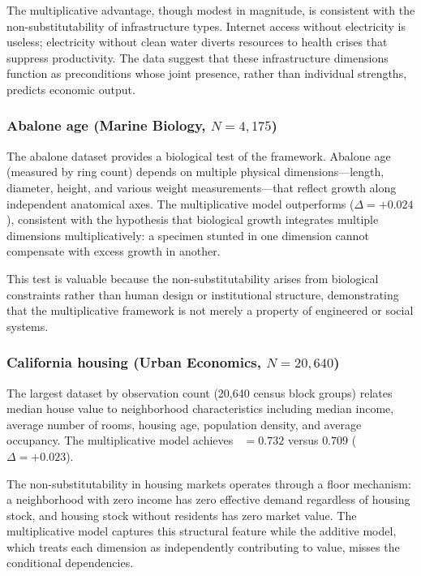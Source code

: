 \documentclass[12pt, a4paper]{article}
\theoremstyle{definition}
\theoremstyle{remark}
\DeclareMathOperator{\Spearman}{\rho_s}
\begin{document}
The multiplicative advantage, though modest in magnitude, is consistent with the non-substitutability of infrastructure types. Internet access without electricity is useless; electricity without clean water diverts resources to health crises that suppress productivity. The data suggest that these infrastructure dimensions function as preconditions whose joint presence, rather than individual strengths, predicts economic output.

\subsubsection{Abalone age (Marine Biology, $N = 4{,}175$)}

The abalone dataset provides a biological test of the framework. Abalone age (measured by ring count) depends on multiple physical dimensions---length, diameter, height, and various weight measurements---that reflect growth along independent anatomical axes. The multiplicative model outperforms ($\Delta = +0.024$), consistent with the hypothesis that biological growth integrates multiple dimensions multiplicatively: a specimen stunted in one dimension cannot compensate with excess growth in another.

This test is valuable because the non-substitutability arises from biological constraints rather than human design or institutional structure, demonstrating that the multiplicative framework is not merely a property of engineered or social systems.

\subsubsection{California housing (Urban Economics, $N = 20{,}640$)}

The largest dataset by observation count (20,640 census block groups) relates median house value to neighborhood characteristics including median income, average number of rooms, housing age, population density, and average occupancy. The multiplicative model achieves $\Spearman = 0.732$ versus $0.709$ ($\Delta = +0.023$).

The non-substitutability in housing markets operates through a floor mechanism: a neighborhood with zero income has zero effective demand regardless of housing stock, and housing stock without residents has zero market value. The multiplicative model captures this structural feature while the additive model, which treats each dimension as independently contributing to value, misses the conditional dependencies.
\end{document}
